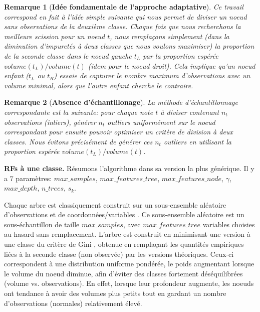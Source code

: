 \documentclass[a4paper, 12pt]{article}
\newtheorem{remarque}{Remarque}
\begin{document}
\begin{remarque}[\textbf{Idée fondamentale de l'approche adaptative}]
Ce travail correspond en fait à l'idée simple suivante qui nous permet de diviser un noeud sans observations de la deuxième classe.
Chaque fois que nous recherchons la meilleure scission pour un noeud $t$, nous remplaçons simplement (dans la diminution d'impuretés à deux classes que nous voulons maximiser) la proportion de la seconde classe dans le noeud gauche $t_L$ par la proportion espérée $volume(t_L)/volume(t)$ (idem pour le noeud droit).
Cela implique qu'un noeud enfant ($t_L$ ou $t_R$) essaie de capturer le nombre maximum d'observations avec un volume minimal, alors que l'autre enfant cherche le contraire.
\end{remarque}


\begin{remarque}[\textbf{Absence d'échantillonage}]
La méthode d'échantillonnage correspondante est la suivante: pour chaque note $t$ à diviser contenant $n_t$ observations (inliers), générer $n_t$ outliers uniformément sur le noeud  correspondant pour ensuite pouvoir optimiser un critère de division à deux classes. Nous \emph {évitons précisément de générer} ces $n_t$ outliers en utilisant la proportion espérée $volume(t_L) / volume(t)$.
\end{remarque}



\textbf{RFs à une classe.} Résumons l'algorithme dans sa version la plus générique.
Il y a $7$ paramètres:
%
$max\_samples$, $max\_features\_tree$, $max\_features\_node$, $\gamma$, $max\_depth$, $n\_trees$, $s_k$.
%

Chaque arbre est classiquement construit sur un sous-ensemble aléatoire d'observations et de coordonnées/variables  \citep{Ho1998, Panov2007}.
Ce sous-ensemble aléatoire est un sous-échantillon de taille $max\_samples$, avec $max\_features\_tree$ variables choisies au hasard sans remplacement. %
L'arbre est construit en minimisant une version à une classe du critère de Gini \citep{Gini1912}, obtenue en remplaçant les quantités empiriques liées à la seconde classe (non observée) par les versions théoriques. Ceux-ci correspondent à une distribution uniforme pondérée, le poids augmentant lorsque le volume du noeud diminue, afin d'éviter des classes fortement déséquilibrées (volume vs. observations). En effet, lorsque leur profondeur augmente, les noeuds ont tendance à avoir des volumes plus petits tout en gardant un nombre d'observations (normales) relativement élevé.
\end{document}
